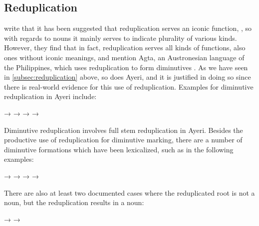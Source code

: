 
\subsection{Reduplication}

\citet{wiltshiremarantz2000} write that it has been suggested that 
reduplication serves an iconic function, 
, so with 
regards to nouns it mainly serves to indicate plurality of various kinds. 
However, they find that in fact, reduplication serves all kinds of functions, 
also ones without iconic meanings, and mention Agta, an Austronesian language 
of the Philippines, which uses reduplication to form diminutives 
\citep[6--9]{healey1960}. As we have seen in \autoref{subsec:reduplication} 
above, so does Ayeri, and it is justified in doing so since there is 
real-world evidence for this use of reduplication. Examples for diminutive 
reduplication in Ayeri include:

\pex
	\a {}
		→ 
	\a {}
		→ 
	\a {}
		→ 
	\a {}
		→ 
\xe

Diminutive reduplication involves full stem reduplication in Ayeri. 
Besides the productive use of reduplication for diminutive marking, there are 
a number of diminutive formations which have been lexicalized, such as in the 
following examples:

\pex
	\a {}
		→ 
	\a {}
		→ 
	\a {}
		→ 
	\a {}
		→ 
\xe

There are also at least two documented cases where the reduplicated root is not 
a noun, but the reduplication results in a noun:

\pex
	\a {}
		→ 
	\a {}
		→ 
\xe

